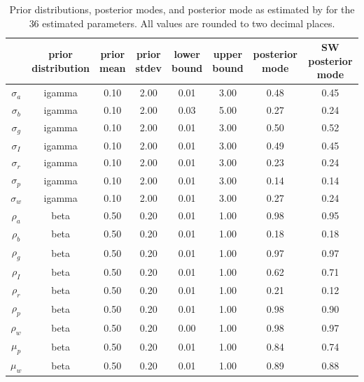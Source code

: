 \documentclass[11pt]{article}
\begin{document}
\begin{table}

\caption{\label{tab:parameter-estimate-table}Prior distributions, posterior modes, and posterior mode as
      estimated by \citet{SmetsWouters2007} for the 36 estimated
      parameters. All values are rounded to two decimal places.}
\centering
\fontsize{9}{11}\selectfont
\begin{tabular}[t]{cccccccc}
\toprule
 & \makecell[c]{prior\\distribution} & \makecell[c]{prior\\mean} & \makecell[c]{prior\\stdev} & \makecell[c]{lower\\bound} & \makecell[c]{upper\\bound} & \makecell[c]{posterior\\mode} & \makecell[c]{SW posterior\\mode}\\
\midrule
$\sigma_a$ & igamma & 0.10 & 2.00 & 0.01 & 3.00 & 0.48 & 0.45\\
$\sigma_b$ & igamma & 0.10 & 2.00 & 0.03 & 5.00 & 0.27 & 0.24\\
$\sigma_g$ & igamma & 0.10 & 2.00 & 0.01 & 3.00 & 0.50 & 0.52\\
$\sigma_I$ & igamma & 0.10 & 2.00 & 0.01 & 3.00 & 0.49 & 0.45\\
$\sigma_r$ & igamma & 0.10 & 2.00 & 0.01 & 3.00 & 0.23 & 0.24\\
\addlinespace
$\sigma_p$ & igamma & 0.10 & 2.00 & 0.01 & 3.00 & 0.14 & 0.14\\
$\sigma_w$ & igamma & 0.10 & 2.00 & 0.01 & 3.00 & 0.27 & 0.24\\
$\rho_a$ & beta & 0.50 & 0.20 & 0.01 & 1.00 & 0.98 & 0.95\\
$\rho_b$ & beta & 0.50 & 0.20 & 0.01 & 1.00 & 0.18 & 0.18\\
$\rho_g$ & beta & 0.50 & 0.20 & 0.01 & 1.00 & 0.97 & 0.97\\
\addlinespace
$\rho_I$ & beta & 0.50 & 0.20 & 0.01 & 1.00 & 0.62 & 0.71\\
$\rho_r$ & beta & 0.50 & 0.20 & 0.01 & 1.00 & 0.21 & 0.12\\
$\rho_p$ & beta & 0.50 & 0.20 & 0.01 & 1.00 & 0.98 & 0.90\\
$\rho_w$ & beta & 0.50 & 0.20 & 0.00 & 1.00 & 0.98 & 0.97\\
$\mu_p$ & beta & 0.50 & 0.20 & 0.01 & 1.00 & 0.84 & 0.74\\
\addlinespace
$\mu_w$ & beta & 0.50 & 0.20 & 0.01 & 1.00 & 0.89 & 0.88\\

\end{tabular}
\end{table}
\end{document}
